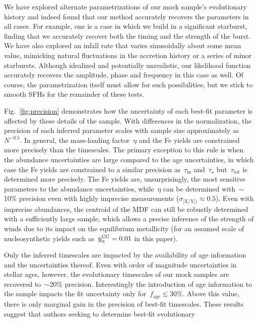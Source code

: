 \documentclass[foo.tex]{subfiles}
\begin{document}
We have explored alternate parametrizations of our mock sample's evolutionary
history and indeed found that our method accurately recovers the parameters
in all cases.
For example, one is a case in which we build in a significant starburst,
finding that we accurately recover both the timing and the strength of the
burst.
We have also explored an infall rate that varies sinusoidally about some mean
value, mimicking natural fluctuations in the accretion history or a series of
minor starbursts.
Although idealized and potentially unrealistic, our likelihood function
accurately recovers the amplitude, phase and frequency in this case as well.
Of course, the parametrization itself must allow for such possibilities, but
we stick to smooth SFHs for the remainder of these tests.
\par
Fig.~\ref{fig:precision} demonstrates how the uncertainty of each best-fit
parameter is affected by these details of the sample.
With differences in the normalization, the precision of each inferred parameter
scales with sample size approximately as~$N^{-0.5}$.
In general, the mass-loading factor~$\eta$ and the Fe yields are constrained
more precisely than the timescales.
The primary exception to this rule is when the abundance uncertainties are
large compared to the age uncertainties, in which case the Fe yields are
constrained to a similar precision as~$\tau_\text{in}$ and~$\tau_\star$
but~$\tau_\text{tot}$ is determined more precisely.
The Fe yields are, unsurprisingly, the most sensitive parameters to the
abundance uncertainties, while~$\eta$ can be determined with~$\sim$10\% precision
even with highly imprecise measurements ($\sigma_\text{[X/Y])} \approx 0.5$).
Even with imprecise abundances, the centroid of the MDF can still be robustly
determined with a sufficiently large sample, which allows a precise inference
of the strength of winds due to its impact on the equilibrium metallicity (for
an assumed scale of nucleosynthetic yields such as~$y_\alpha^\text{CC} = 0.01$ in this
paper).
\par
Only the inferred timescales are impacted by the availability of age
information and the uncertainties thereof.
Even with order of magnitude uncertainties in stellar ages, however, the
evolutionary timescales of our mock samples are recovered to~$\sim$20\%
precision.
Interestingly the introduction of age information to the sample impacts the
fit uncertainty only for~$f_\text{age} \lesssim 30$\%.
Above this value, there is only marginal gain in the precision of best-fit
timescales.
These results suggest that authors seeking to determine best-fit evolutionary
\end{document}
